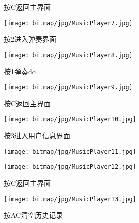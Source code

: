 \begin{figure}[htbp]
	\centering
	\begin{minipage}[htbp]{7.5cm}
		\centering
		\caption{按C返回主界面}
		\label{MusicPlayer7}
		\texttt{[image: bitmap/jpg/MusicPlayer7.jpg]}
	\end{minipage}
	\begin{minipage}[htbp]{7.5cm}
		\centering
		\caption{按2进入弹奏界面}
		\label{MusicPlayer8}
		\texttt{[image: bitmap/jpg/MusicPlayer8.jpg]}
	\end{minipage}
	\begin{minipage}[htbp]{7.5cm}
		\centering
		\caption{按1弹奏do}
		\label{MusicPlayer9}
		\texttt{[image: bitmap/jpg/MusicPlayer9.jpg]}
	\end{minipage}
	\begin{minipage}[htbp]{7.5cm}
		\centering
		\caption{按C返回主界面}
		\label{MusicPlayer10}
		\texttt{[image: bitmap/jpg/MusicPlayer10.jpg]}
	\end{minipage}
	\begin{minipage}[htbp]{7.5cm}
		\centering
		\caption{按3进入用户信息界面}
		\label{MusicPlayer11}
		\texttt{[image: bitmap/jpg/MusicPlayer11.jpg]}
	\end{minipage}
	\begin{minipage}[htbp]{7.5cm}
		\centering
		\caption{按C返回主界面}
		\label{MusicPlayer12}
		\texttt{[image: bitmap/jpg/MusicPlayer12.jpg]}
	\end{minipage}
\end{figure}
\begin{figure}[htbp]
	\centering
	\caption{按AC清空历史记录}
	\label{MusicPlayer13}
	\texttt{[image: bitmap/jpg/MusicPlayer13.jpg]}
\end{figure}
\newpage
